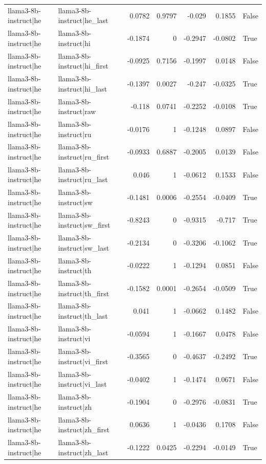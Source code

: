 \begin{table}
\begin{tabular}{l l r r r r l}
llama3-8b-instruct|he & llama3-8b-instruct|he_last & 0.0782 & 0.9797 & -0.029 & 0.1855 & False \\
llama3-8b-instruct|he & llama3-8b-instruct|hi & -0.1874 & 0 & -0.2947 & -0.0802 & True \\
llama3-8b-instruct|he & llama3-8b-instruct|hi_first & -0.0925 & 0.7156 & -0.1997 & 0.0148 & False \\
llama3-8b-instruct|he & llama3-8b-instruct|hi_last & -0.1397 & 0.0027 & -0.247 & -0.0325 & True \\
llama3-8b-instruct|he & llama3-8b-instruct|raw & -0.118 & 0.0741 & -0.2252 & -0.0108 & True \\
llama3-8b-instruct|he & llama3-8b-instruct|ru & -0.0176 & 1 & -0.1248 & 0.0897 & False \\
llama3-8b-instruct|he & llama3-8b-instruct|ru_first & -0.0933 & 0.6887 & -0.2005 & 0.0139 & False \\
llama3-8b-instruct|he & llama3-8b-instruct|ru_last & 0.046 & 1 & -0.0612 & 0.1533 & False \\
llama3-8b-instruct|he & llama3-8b-instruct|sw & -0.1481 & 0.0006 & -0.2554 & -0.0409 & True \\
llama3-8b-instruct|he & llama3-8b-instruct|sw_first & -0.8243 & 0 & -0.9315 & -0.717 & True \\
llama3-8b-instruct|he & llama3-8b-instruct|sw_last & -0.2134 & 0 & -0.3206 & -0.1062 & True \\
llama3-8b-instruct|he & llama3-8b-instruct|th & -0.0222 & 1 & -0.1294 & 0.0851 & False \\
llama3-8b-instruct|he & llama3-8b-instruct|th_first & -0.1582 & 0.0001 & -0.2654 & -0.0509 & True \\
llama3-8b-instruct|he & llama3-8b-instruct|th_last & 0.041 & 1 & -0.0662 & 0.1482 & False \\
llama3-8b-instruct|he & llama3-8b-instruct|vi & -0.0594 & 1 & -0.1667 & 0.0478 & False \\
llama3-8b-instruct|he & llama3-8b-instruct|vi_first & -0.3565 & 0 & -0.4637 & -0.2492 & True \\
llama3-8b-instruct|he & llama3-8b-instruct|vi_last & -0.0402 & 1 & -0.1474 & 0.0671 & False \\
llama3-8b-instruct|he & llama3-8b-instruct|zh & -0.1904 & 0 & -0.2976 & -0.0831 & True \\
llama3-8b-instruct|he & llama3-8b-instruct|zh_first & 0.0636 & 1 & -0.0436 & 0.1708 & False \\
llama3-8b-instruct|he & llama3-8b-instruct|zh_last & -0.1222 & 0.0425 & -0.2294 & -0.0149 & True \\

\end{tabular}
\end{table}
